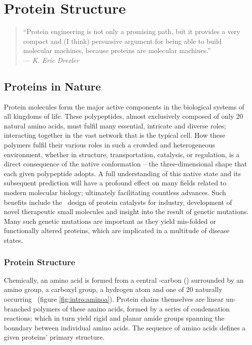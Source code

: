 \chapter{Protein Structure}
\label{chapter:protein_structure}

\begin{quote}
``Protein engineering is not only a promising path, but it provides a very compact and (I think) persuasive argument for being able to build molecular machines, because proteins are molecular machines.'' \\ 
--- \textit{K. Eric Drexler}
\end{quote}


\section{Proteins in Nature}

Protein molecules form the major active components in the biological systems of all kingdoms of life. These polypeptides, almost exclusively composed of only  20 natural amino acids, must fulfil many essential, intricate and diverse roles; interacting together in the vast network that is the typical cell. How these polymers fulfil  their various roles in such a crowded and heterogeneous environment, whether in structure, transportation, catalysis, or regulation, is a direct consequence of the native conformation -- the three-dimensional shape that each given polypeptide adopts. A full understanding of this native state and its subsequent prediction will have a profound effect on many fields related to modern molecular biology; ultimately facilitating countless advances.
Such benefits include the \abinitio\ design of protein catalysts for industry, development of novel therapeutic small molecules and  insight into the result of genetic mutations. Many such genetic mutations are important as they yield  mis-folded or functionally altered proteins, which are implicated in a multitude of disease states.


\subsection{Protein Structure}

Chemically, an amino acid is formed from a central \al-carbon (\ca) surrounded by an amino group, a carboxyl group, a hydrogen atom and one of 20 naturally occurring \sidechains\ (figure \ref{fig:intro:aminoa}). Protein chains themselves are linear un-branched polymers of these amino acids,
formed by a series of condensation reactions; which in turn yield rigid and planar amide groups spanning the boundary between individual
amino acids. The sequence of  amino acids defines a given proteins' primary structure.

